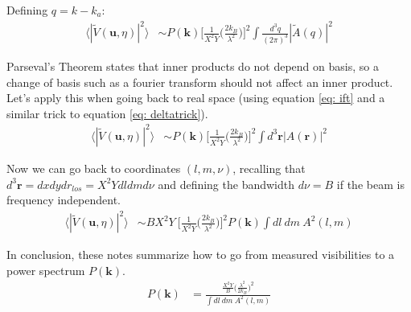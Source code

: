 \documentclass[12pt]{article}
\begin{document}
\noindent Defining $q = k - k_{a}$:
\begin{align}
\langle |\tilde{V}(\boldsymbol{u},\eta) |^{2} \rangle &\sim P(\boldsymbol{k})  \bigg[{\frac{1}{X^{2}Y}}\Big({\frac{2k_{B}}{\lambda^{2}}}\Big)\bigg]^{2} \int {\frac{d^{3}q}{(2\pi)^{3}}} |\tilde{A}(q)|^{2}
\end{align}

\noindent Parseval's Theorem states that inner products do not depend on basis, so a change of basis such as a fourier transform should not affect an inner product. Let's apply this when going back to real space (using equation \ref{eq: ift} and a similar trick to equation \ref{eq: deltatrick}).
\begin{align}
\langle |\tilde{V}(\boldsymbol{u},\eta) |^{2} \rangle &\sim P(\boldsymbol{k})  \bigg[{\frac{1}{X^{2}Y}}\Big({\frac{2k_{B}}{\lambda^{2}}}\Big)\bigg]^{2} \int d^{3}\boldsymbol{r} |A(\boldsymbol{r})|^{2}
\end{align}

\noindent Now we can go back to coordinates $(l, m, \nu)$, recalling that $d^{3}\boldsymbol{r} = dxdydr_{los} = X^{2}Ydldmd\nu$ and defining the bandwidth $d\nu = B$ if the beam is frequency independent.
\begin{align}
\langle |\tilde{V}(\boldsymbol{u},\eta) |^{2} \rangle &\sim B X^{2} Y \ \bigg[{\frac{1}{X^{2}Y}}\Big({\frac{2k_{B}}{\lambda^{2}}}\Big)\bigg]^{2}P(\boldsymbol{k}) \int dl \ dm \ A^{2}(l, m)
\end{align}

\noindent In conclusion, these notes summarize how to go from measured visibilities to a power spectrum $P(\boldsymbol{k})$.
\begin{align}
P(\boldsymbol{k}) &= {\frac{{\frac{X^{2}Y}{B}}\Big({\frac{\lambda^{2}}{2k_{B}}}\Big)^{2}}{\int dl \ dm \ A^{2}(l,m)}}
\end{align}
\end{document}
